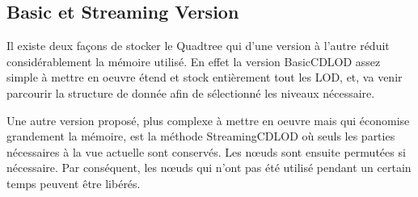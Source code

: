 \subsection{Basic et Streaming Version}

    Il existe deux façons de stocker le Quadtree qui d'une version à l'autre réduit considérablement la mémoire utilisé. En effet la version BasicCDLOD assez simple à mettre en oeuvre étend et stock entièrement tout les LOD, et, va venir parcourir la structure de donnée afin de sélectionné les niveaux nécessaire.
   
    Une autre version proposé, plus complexe à mettre en oeuvre mais qui économise grandement la mémoire, est la méthode StreamingCDLOD où seuls les parties nécessaires à la vue actuelle sont conservés. Les n\oe{}uds sont ensuite permutées si nécessaire. Par conséquent, les n\oe{}uds qui n'ont pas été utilisé pendant un certain temps peuvent être libérés.
